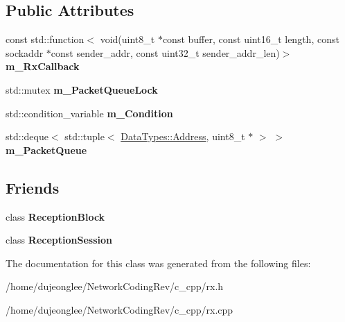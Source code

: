 \subsection*{Public Attributes}
\begin{DoxyCompactItemize}
\item 
const std\+::function$<$ void(uint8\+\_\+t $\ast$const buffer, const uint16\+\_\+t length, const sockaddr $\ast$const sender\+\_\+addr, const uint32\+\_\+t sender\+\_\+addr\+\_\+len)$>$ {\bfseries m\+\_\+\+Rx\+Callback}\hypertarget{class_network_coding_1_1_reception_af4982d41ddad866f366f7d17a29c7de0}{}\label{class_network_coding_1_1_reception_af4982d41ddad866f366f7d17a29c7de0}

\item 
std\+::mutex {\bfseries m\+\_\+\+Packet\+Queue\+Lock}\hypertarget{class_network_coding_1_1_reception_a49d297f20d3c70cc334ff76846d912d4}{}\label{class_network_coding_1_1_reception_a49d297f20d3c70cc334ff76846d912d4}

\item 
std\+::condition\+\_\+variable {\bfseries m\+\_\+\+Condition}\hypertarget{class_network_coding_1_1_reception_ad79660bdfc37f6d0f1c5d91059ba0c8e}{}\label{class_network_coding_1_1_reception_ad79660bdfc37f6d0f1c5d91059ba0c8e}

\item 
std\+::deque$<$ std\+::tuple$<$ \hyperlink{class_network_coding_1_1_data_types_1_1_address}{Data\+Types\+::\+Address}, uint8\+\_\+t $\ast$ $>$ $>$ {\bfseries m\+\_\+\+Packet\+Queue}\hypertarget{class_network_coding_1_1_reception_adc73afa8de48a266ff81eef3a023e3b4}{}\label{class_network_coding_1_1_reception_adc73afa8de48a266ff81eef3a023e3b4}

\end{DoxyCompactItemize}
\subsection*{Friends}
\begin{DoxyCompactItemize}
\item 
class {\bfseries Reception\+Block}\hypertarget{class_network_coding_1_1_reception_a3b0db9f68934c426ad673e63d3183b29}{}\label{class_network_coding_1_1_reception_a3b0db9f68934c426ad673e63d3183b29}

\item 
class {\bfseries Reception\+Session}\hypertarget{class_network_coding_1_1_reception_a6ed072e1f429e5e4bda0467d37cf64b8}{}\label{class_network_coding_1_1_reception_a6ed072e1f429e5e4bda0467d37cf64b8}

\end{DoxyCompactItemize}


The documentation for this class was generated from the following files\+:\begin{DoxyCompactItemize}
\item 
/home/dujeonglee/\+Network\+Coding\+Rev/c\+\_\+cpp/rx.\+h\item 
/home/dujeonglee/\+Network\+Coding\+Rev/c\+\_\+cpp/rx.\+cpp\end{DoxyCompactItemize}
